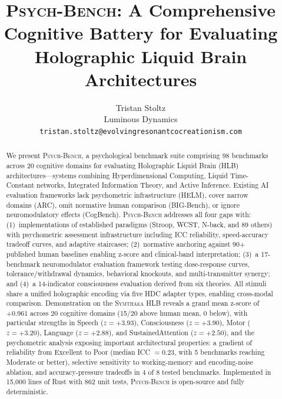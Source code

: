 \documentclass[11pt,letterpaper]{article}
\newcommand{\symthaea}{\textsc{Symthaea}}
\newcommand{\psychbench}{\textsc{Psych-Bench}}
\newcommand{\hlb}{\textsc{HLB}}
\begin{document}
\title{\psychbench{}: A Comprehensive Cognitive Battery for Evaluating\\
Holographic Liquid Brain Architectures}

\author{Tristan Stoltz\\
Luminous Dynamics\\
\texttt{tristan.stoltz@evolvingresonantcocreationism.com}}

\date{}
\maketitle

\begin{abstract}
\noindent
We present \psychbench{}, a psychological benchmark suite comprising 98 benchmarks across 20 cognitive domains for evaluating Holographic Liquid Brain (\hlb{}) architectures---systems combining Hyperdimensional Computing, Liquid Time-Constant networks, Integrated Information Theory, and Active Inference. Existing AI evaluation frameworks lack psychometric infrastructure (HELM), cover narrow domains (ARC), omit normative human comparison (BIG-Bench), or ignore neuromodulatory effects (CogBench). \psychbench{} addresses all four gaps with: (1)~implementations of established paradigms (Stroop, WCST, N-back, and 89 others) with psychometric assessment infrastructure including ICC reliability, speed-accuracy tradeoff curves, and adaptive staircases; (2)~normative anchoring against 90+ published human baselines enabling z-score and clinical-band interpretation; (3)~a 17-benchmark neuromodulator evaluation framework testing dose-response curves, tolerance/withdrawal dynamics, behavioral knockouts, and multi-transmitter synergy; and (4)~a 14-indicator consciousness evaluation derived from six theories. All stimuli share a unified holographic encoding via five HDC adapter types, enabling cross-modal comparison. Demonstration on the \symthaea{} \hlb{} reveals a grand mean z-score of $+0.961$ across 20 cognitive domains (15/20 above human mean, 0 below), with particular strengths in Speech ($z = +3.93$), Consciousness ($z = +3.90$), Motor ($z = +3.20$), Language ($z = +2.88$), and SustainedAttention ($z = +2.50$), and the psychometric analysis exposing important architectural properties: a gradient of reliability from Excellent to Poor (median ICC $= 0.23$, with 5 benchmarks reaching Moderate or better), selective sensitivity to working-memory and encoding-noise ablation, and accuracy-pressure tradeoffs in 4 of 8 tested benchmarks. Implemented in 15,000 lines of Rust with 862 unit tests, \psychbench{} is open-source and fully deterministic.
\end{abstract}
\end{document}
